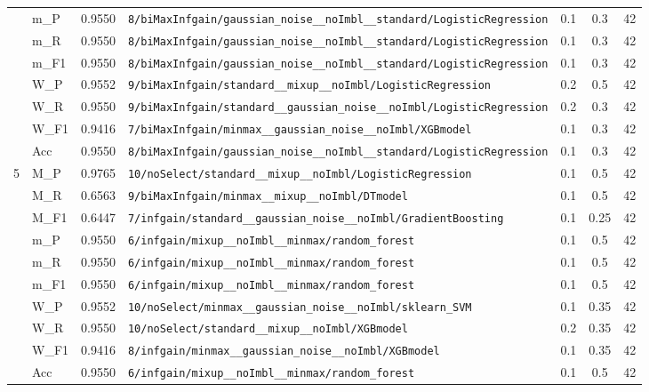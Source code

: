 \begin{table}[htbp]
\begin{tabular}{|c|l|c|>{\ttfamily\footnotesize}p{7.2cm}|c|c|c|}
 & m\_P & 0.9550 & \texttt{8/biMaxInfgain/gaussian\_noise\_\_noImbl\_\_standard/LogisticRegression} & 0.1 & 0.3  & 42 \\ 
 & m\_R & 0.9550 & \texttt{8/biMaxInfgain/gaussian\_noise\_\_noImbl\_\_standard/LogisticRegression} & 0.1 & 0.3  & 42 \\ 
 & m\_F1 & 0.9550 & \texttt{8/biMaxInfgain/gaussian\_noise\_\_noImbl\_\_standard/LogisticRegression} & 0.1 & 0.3  & 42 \\ 
 & W\_P & 0.9552 & \texttt{9/biMaxInfgain/standard\_\_mixup\_\_noImbl/LogisticRegression} & 0.2 & 0.5  & 42 \\ 
 & W\_R & 0.9550 & \texttt{9/biMaxInfgain/standard\_\_gaussian\_noise\_\_noImbl/LogisticRegression} & 0.2 & 0.3  & 42 \\ 
 & W\_F1 & 0.9416 & \texttt{7/biMaxInfgain/minmax\_\_gaussian\_noise\_\_noImbl/XGBmodel} & 0.1 & 0.3  & 42 \\ 
 & Acc & 0.9550 & \texttt{8/biMaxInfgain/gaussian\_noise\_\_noImbl\_\_standard/LogisticRegression} & 0.1 & 0.3  & 42 \\ 
\hline
\multirow{10}{*}{5} & M\_P & 0.9765 & \texttt{10/noSelect/standard\_\_mixup\_\_noImbl/LogisticRegression} & 0.1 & 0.5  & 42 \\ 
 & M\_R & 0.6563 & \texttt{9/biMaxInfgain/minmax\_\_mixup\_\_noImbl/DTmodel} & 0.1 & 0.5  & 42 \\ 
 & M\_F1 & 0.6447 & \texttt{7/infgain/standard\_\_gaussian\_noise\_\_noImbl/GradientBoosting} & 0.1 & 0.25  & 42 \\ 
 & m\_P & 0.9550 & \texttt{6/infgain/mixup\_\_noImbl\_\_minmax/random\_forest} & 0.1 & 0.5  & 42 \\ 
 & m\_R & 0.9550 & \texttt{6/infgain/mixup\_\_noImbl\_\_minmax/random\_forest} & 0.1 & 0.5  & 42 \\ 
 & m\_F1 & 0.9550 & \texttt{6/infgain/mixup\_\_noImbl\_\_minmax/random\_forest} & 0.1 & 0.5  & 42 \\ 
 & W\_P & 0.9552 & \texttt{10/noSelect/minmax\_\_gaussian\_noise\_\_noImbl/sklearn\_SVM} & 0.1 & 0.35  & 42 \\ 
 & W\_R & 0.9550 & \texttt{10/noSelect/standard\_\_mixup\_\_noImbl/XGBmodel} & 0.2 & 0.35  & 42 \\ 
 & W\_F1 & 0.9416 & \texttt{8/infgain/minmax\_\_gaussian\_noise\_\_noImbl/XGBmodel} & 0.1 & 0.35  & 42 \\ 
 & Acc & 0.9550 & \texttt{6/infgain/mixup\_\_noImbl\_\_minmax/random\_forest} & 0.1 & 0.5  & 42 \\ 
\hline
\end{tabular}
\end{table}